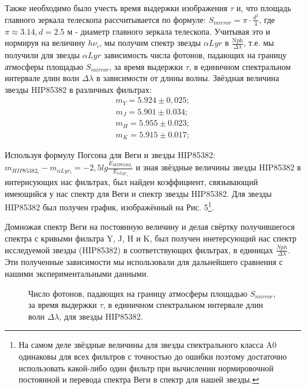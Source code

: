 \documentclass[a4paper]{article}
\begin{document}
Также необходимо было учесть время выдержки изображения $\tau$ и, что площадь главного зеркала телескопа рассчитывается по формуле: $S_{mirror} = \pi\cdot\frac{d^2}{4}$, где $\pi\approx 3.14, d = 2.5 \text{ м}$ - диаметр главного зеркала телескопа. Учитывая это и нормируя на величину $h\nu_i$, мы получим спектр звезды $\alpha Lyr$ в $\frac{\text{Nph}}{\Delta\lambda}$, т.е. мы получили для звезды $\alpha Lyr$ зависимость числа фотонов, падающих на границу атмосферы площадью $S_{mirror}$, за время выдержки $\tau$, в единичном спектральном интервале длин волн $\Delta\lambda$ в зависимости от длины волны. Звёздная величина звезды HIP85382 в различных фильтрах:
\begin{eqnarray*}
m_Y = 5.924\pm 0,025; \\
m_J = 5.901\pm 0.034; \\
m_H = 5.955\pm 0.023; \\
m_K = 5.915\pm 0.017;
\end{eqnarray*}

Используя формулу Погсона для Веги и звезды HIP85382: $m_{HIP85382_i} - m_{\alpha Lyr_i}= -2,5lg{\frac{E_{HIP85382_i}}{E_{\alpha Lyr_i}}}$ и зная звёздные величины звезды HIP85382 в интерисующих нас фильтрах, был найден коэффициент, связывающий имеющийся у нас спектр для Веги и спектр звезды HIP85382. Для звезды HIP85382 был получен график, изображённый на Рис. 5\footnote{На самом деле звёздные величины для звезды спектрального класса A0 одинаковы для всех фильтров с точностью до ошибки поэтому достаточно использовать какой-либо один фильтр при вычислении нормировочной постоянной и перевода спектра Веги в спектр для нашей звезды.}.

Домножая спектр Веги на постоянную величину и делая свёртку получившегося спектра с кривыми фильтра Y, J, H и K, был получен инетерсующий нас спектр исследуемой звезды  (HIP85382) в соответствующих фильтрах, в единицах $\frac{Nph}{\Delta\lambda}$. Эти полученные зависимости мы использовали для дальнейшего сравнения с нашими экспериментальными данными.

\begin{figure}[h]
\caption{Число фотонов, падающих на границу атмосферы площадью $S_{mirror}$, за время выдержки $\tau$, в единичном спектральном интервале длин волн $\Delta\lambda$, для звезды HIP85382.}
\label{ris:image}
\end{figure}
\end{document}
